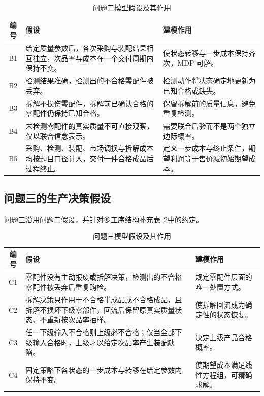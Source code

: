 \begin{table}[H]
  \centering
  \caption{问题二模型假设及其作用}
  \label{tab:q2-assumptions}
  \begin{tabularx}{\textwidth}{c>{\raggedright\arraybackslash}p{}>{\raggedright\arraybackslash}X}
    \toprule
    编号 & 假设 & 建模作用 \\
    \midrule
    B1 & 给定质量参数后，各次采购与装配结果相互独立，次品率与成本在一个交付周期内保持不变。 & 使状态转移与一步成本保持齐次，MDP 可解。 \\
    B2 & 检测结果准确，检测出的不合格零配件被丢弃。 & 检测动作将状态确定地更新为已知合格或缺失。 \\
    B3 & 拆解不损伤零配件，拆解前已确认合格的零配件仍保持已知合格。 & 保留拆解前的质量信息，避免重复检测。 \\
    B4 & 未检测零配件的真实质量不可直接观察，仅以联合信念表示。 & 需要联合后验而不是两个独立边际概率。 \\
    B5 & 采购、检测、装配、市场调换与拆解成本均按题目口径计入，交付一件合格成品后过程终止。 & 定义一步成本与终止条件，期望利润等于售价减初始期望成本。 \\
    \bottomrule
  \end{tabularx}
\end{table}

\subsection{问题三的生产决策假设}

问题三沿用问题二假设，并针对多工序结构补充表~\ref{tab:q3-assumptions}中的约定。

\begin{table}[H]
  \centering
  \caption{问题三模型假设及其作用}
  \label{tab:q3-assumptions}
  \begin{tabularx}{\textwidth}{c>{\raggedright\arraybackslash}p{}>{\raggedright\arraybackslash}X}
    \toprule
    编号 & 假设 & 建模作用 \\
    \midrule
    C1 & 零配件没有主动报废或拆解决策，检测出的不合格零配件被丢弃后重复购检。 & 规定零配件层面的唯一处置方式。 \\
    C2 & 拆解决策只作用于不合格半成品或不合格成品，且拆解不损坏下级零部件，回流后保留原真实质量状态、不重新按次品率抽样。 & 使拆解回流成为确定性的状态恢复。 \\
    C3 & 任一下级输入不合格则上级必不合格；仅当全部下级输入合格时，上级才以给定次品率产生装配缺陷。 & 决定上级产品合格概率。 \\
    C4 & 固定策略下各状态的一步成本与转移在给定参数内保持不变。 & 使期望成本满足线性方程组，可精确求解。 \\
    \bottomrule
  \end{tabularx}
\end{table}

